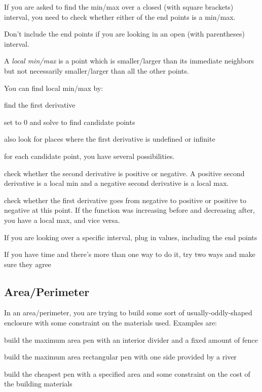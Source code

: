\documentclass[fleqn]{article}
\begin{document}
\begin{itemize}
  \item If you are asked to find the min/max over a closed (with square brackets) interval, you need to check whether
    either of the end points is a min/max.
  \item Don't include the end points if you are looking in an open (with parentheses) interval.
  \item A {\em local min/max} is a point which is smaller/larger than its immediate neighbors but not necessarily
    smaller/larger than all the other points.
  \item You can find local min/max by:
    \begin{itemize*}
      \item find the first derivative
      \item set to 0 and solve to find candidate points
      \item also look for places where the first derivative is undefined or infinite
      \item for each candidate point, you have several possibilities.
        \begin{itemize*}
          \item check whether the second derivative is positive or negative.  A positive second derivative is a local min
            and a negative second derivative is a local max.
          \item check whether the first derivative goes from negative to positive or positive to negative at this
            point.  If the function was increasing before and decreasing after, you have a local max, and vice versa.
          \item If you are looking over a specific interval, plug in values, including the end points
        \end{itemize*}
        If you have time and there's more than one way to do it, try two ways and make sure they agree
    \end{itemize*}
\end{itemize}

\subsection{Area/Perimeter}

In an area/perimeter, you are trying to build some sort of usually-oddly-shaped enclosure with some constraint on the
materials used.  Examples are:

\begin{itemize*}
\item build the maximum area pen with an interior divider and a fixed amount of fence
\item build the maximum area rectangular pen with one side provided by a river
\item build the cheapest pen with a specified area and some constraint on the cost of the building materials
\end{itemize*}
\end{document}
